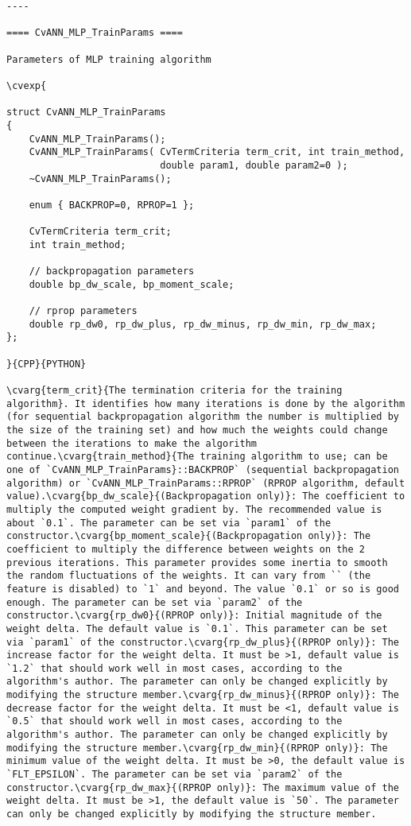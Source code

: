 \begin{verbatim}
----

==== CvANN_MLP_TrainParams ====

Parameters of MLP training algorithm

\cvexp{

struct CvANN_MLP_TrainParams
{
    CvANN_MLP_TrainParams();
    CvANN_MLP_TrainParams( CvTermCriteria term_crit, int train_method,
                           double param1, double param2=0 );
    ~CvANN_MLP_TrainParams();

    enum { BACKPROP=0, RPROP=1 };

    CvTermCriteria term_crit;
    int train_method;

    // backpropagation parameters
    double bp_dw_scale, bp_moment_scale;

    // rprop parameters
    double rp_dw0, rp_dw_plus, rp_dw_minus, rp_dw_min, rp_dw_max;
};

}{CPP}{PYTHON}

\cvarg{term_crit}{The termination criteria for the training algorithm}. It identifies how many iterations is done by the algorithm (for sequential backpropagation algorithm the number is multiplied by the size of the training set) and how much the weights could change between the iterations to make the algorithm continue.\cvarg{train_method}{The training algorithm to use; can be one of `CvANN_MLP_TrainParams}::BACKPROP` (sequential backpropagation algorithm) or `CvANN_MLP_TrainParams::RPROP` (RPROP algorithm, default value).\cvarg{bp_dw_scale}{(Backpropagation only)}: The coefficient to multiply the computed weight gradient by. The recommended value is about `0.1`. The parameter can be set via `param1` of the constructor.\cvarg{bp_moment_scale}{(Backpropagation only)}: The coefficient to multiply the difference between weights on the 2 previous iterations. This parameter provides some inertia to smooth the random fluctuations of the weights. It can vary from `` (the feature is disabled) to `1` and beyond. The value `0.1` or so is good enough. The parameter can be set via `param2` of the constructor.\cvarg{rp_dw0}{(RPROP only)}: Initial magnitude of the weight delta. The default value is `0.1`. This parameter can be set via `param1` of the constructor.\cvarg{rp_dw_plus}{(RPROP only)}: The increase factor for the weight delta. It must be >1, default value is `1.2` that should work well in most cases, according to the algorithm's author. The parameter can only be changed explicitly by modifying the structure member.\cvarg{rp_dw_minus}{(RPROP only)}: The decrease factor for the weight delta. It must be <1, default value is `0.5` that should work well in most cases, according to the algorithm's author. The parameter can only be changed explicitly by modifying the structure member.\cvarg{rp_dw_min}{(RPROP only)}: The minimum value of the weight delta. It must be >0, the default value is `FLT_EPSILON`. The parameter can be set via `param2` of the constructor.\cvarg{rp_dw_max}{(RPROP only)}: The maximum value of the weight delta. It must be >1, the default value is `50`. The parameter can only be changed explicitly by modifying the structure member.


\end{verbatim}

